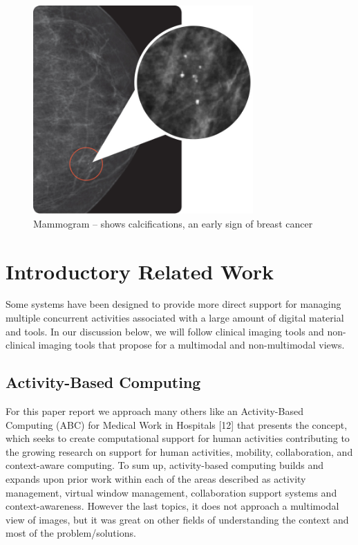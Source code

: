 \begin{figure}[!hbt]
\centering
\includegraphics[width=0.75\textwidth]{calcifications.png}
\caption{\label{fig:frog}Mammogram – shows calcifications, an early sign of breast cancer
}
\end{figure}

\clearpage

\section{Introductory Related Work}

Some systems have been designed to provide more direct support for managing multiple concurrent activities associated with a large amount of digital material and tools. In our discussion below, we will follow clinical imaging tools and non-clinical imaging tools that propose for a multimodal and non-multimodal views.

\subsection{Activity-Based Computing}

For this paper report we approach many others like an Activity-Based Computing (ABC) for Medical Work in Hospitals [12] that presents the concept, which seeks to create computational support for human activities contributing to the growing research on support for human activities, mobility, collaboration, and context-aware computing. To sum up, activity-based computing builds and expands upon prior work within each of the areas described as activity management, virtual window management, collaboration support systems and context-awareness. However the last topics, it does not approach a multimodal view of images, but it was great on other fields of understanding the context and most of the problem/solutions.

